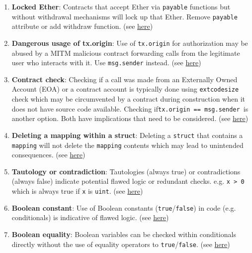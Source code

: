 \begin{enumerate}
\item\textbf{Locked Ether}: Contracts that accept Ether via \verb|payable| functions but without withdrawal mechanisms will lock up that Ether. Remove \verb|payable| attribute or add withdraw function. (see \href{https://github.com/crytic/slither/wiki/Detector-Documentation\#contracts-that-lock-ether}{here})

\item\textbf{Dangerous usage of tx.origin}: Use of \verb|tx.origin| for authorization may be abused by a MITM malicious contract forwarding calls from the legitimate user who interacts with it. Use \verb|msg.sender| instead. (see \href{https://swcregistry.io/docs/SWC-115}{here})

\item\textbf{Contract check}: Checking if a call was made from an Externally Owned Account (EOA) or a contract account is typically done using \verb|extcodesize| check which may be circumvented by a contract during construction when it does not have source code available. Checking if\linebreak\verb|tx.origin == msg.sender |is another option. Both have implications that need to be considered. (see \href{https://consensys.net/blog/blockchain-development/solidity-best-practices-for-smart-contract-security/}{here})

\item\textbf{Deleting a mapping within a struct}: Deleting a \verb|struct| that contains a \verb|mapping| will not delete the \verb|mapping| contents which may lead to unintended consequences. (see \href{https://github.com/crytic/slither/wiki/Detector-Documentation\#deletion-on-mapping-containing-a-structure}{here})

\item\textbf{Tautology or contradiction}: Tautologies (always true) or contradictions (always false) indicate potential flawed logic or redundant checks. e.g. \verb|x > 0| which is always true if \verb|x| is \verb|uint|. (see \href{https://github.com/crytic/slither/wiki/Detector-Documentation\#tautology-or-contradiction}{here})

\item\textbf{Boolean constant}: Use of Boolean constants (\verb|true|/\verb|false|) in code (e.g. conditionals) is indicative of flawed logic. (see \href{https://github.com/crytic/slither/wiki/Detector-Documentation\#misuse-of-a-boolean-constant}{here})

\item\textbf{Boolean equality}: Boolean variables can be checked within conditionals directly without the use of equality operators to \verb|true|/\verb|false|. (see \href{https://github.com/crytic/slither/wiki/Detector-Documentation\#boolean-equality}{here})


\end{enumerate}
